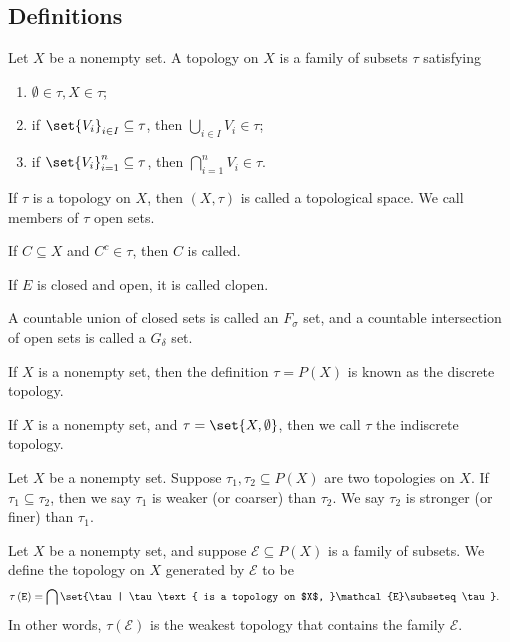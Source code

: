 \subsection{Definitions}%
\begin{definition}
  Let $X$ be a nonempty set. A topology on $X$ is a family of subsets $\tau$ satisfying
  \begin{enumerate}[(1)]
    \item $\emptyset\in \tau,X\in \tau$;
    \item if $\set{V_i}_{i\in I}\subseteq \tau$, then $\bigcup_{i\in I}V_i\in \tau$;
    \item if $\set{V_i}_{i=1}^{n}\subseteq \tau$, then $\bigcap_{i=1}^{n}V_i \in \tau$.
  \end{enumerate}
  If $\tau$ is a topology on $X$, then $\left(X,\tau\right)$ is called a topological space. We call members of $\tau$ open sets.\newline

  If $C\subseteq X$ and $C^{c}\in \tau$, then $C$ is called.\newline

  If $E$ is closed and open, it is called clopen.\newline

  A countable union of closed sets is called an $F_{\sigma}$ set, and a countable intersection of open sets is called a $G_{\delta}$ set.
\end{definition}
\begin{definition}
  If $X$ is a nonempty set, then the definition $\tau = P(X)$ is known as the discrete topology.\newline

  If $X$ is a nonempty set, and $\tau = \set{X,\emptyset}$, then we call $\tau$ the indiscrete topology.
\end{definition}
\begin{definition}
  Let $X$ be a nonempty set. Suppose $\tau_1,\tau_2\subseteq P(X)$ are two topologies on $X$. If $\tau_1\subseteq \tau_2$, then we say $\tau_1$ is weaker (or coarser) than $\tau_2$. We say $\tau_2$ is stronger (or finer) than $\tau_1$.
\end{definition}
\begin{definition}
  Let $X$ be a nonempty set, and suppose $\mathcal{E}\subseteq P(X)$ is a family of subsets. We define the topology on $X$ generated by $\mathcal{E}$ to be
  \begin{align*}
    \tau\left(\mathcal{E}\right) &= \bigcap\set{\tau | \tau\text{ is a topology on $X$, }\mathcal{E}\subseteq \tau}.
  \end{align*}
  In other words, $\tau\left(\mathcal{E}\right)$ is the weakest topology that contains the family $\mathcal{E}$.
\end{definition}
